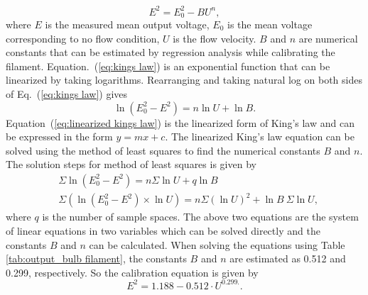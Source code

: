 \begin{equation}\label{eq:kings law}
    E^2 = E_0^2 - BU^n,
\end{equation}
where $E$ is the measured mean output voltage, $E_0$ is the mean voltage corresponding to no flow condition, $U$ is the flow velocity. $B$ and $n$ are numerical constants that can be estimated by regression analysis while calibrating the filament. Equation.~(\ref{eq:kings law}) is an exponential function that can be linearized by taking logarithms. Rearranging and taking natural log on both sides of Eq.~(\ref{eq:kings law}) gives 
\begin{equation}\label{eq:linearized kings law}
    \ln{(E_0^2-E^2)} = n\ln{U} + \ln{B}.
\end{equation}
Equation~(\ref{eq:linearized kings law}) is the linearized form of King's law and can be expressed in the form $y = mx + c$. The linearized King's law equation can be solved using the method of least squares to find the numerical constants $B$ and $n$. The solution steps for method of least squares is given by
\begin{align}
    & \Sigma \ln{(E_0^2-E^2)} = n\Sigma \ln{U} + q\ln{B}\label{eq:lin eq 1}\\ 
    & \Sigma (\ln{(E_0^2-E^2)}\times \ln{U}) = n \Sigma (\ln{U})^2 + \ln{B}~ \Sigma\ln{U}\label{eq:lin eq 2},
\end{align}
where $q$ is the number of sample spaces. The above two equations are the system of linear equations in two variables which can be solved directly and the constants $B$ and $n$ can be calculated. When solving the equations using Table \ref{tab:output_bulb filament}, the constants $B$ and $n$ are estimated as 0.512 and 0.299, respectively. So the calibration equation is given by
\begin{equation}\label{eq:calib_eqn_filament}
    E^2 = 1.188 - 0.512\cdot U^{0.299.}.
\end{equation}
